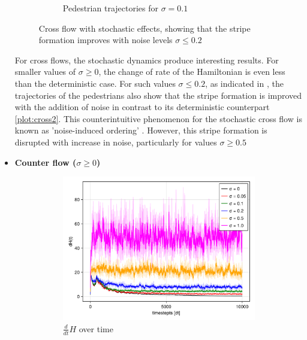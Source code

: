 \begin{itemize}
\begin{figure}[H]
\begin{subfigure}{.49\textwidth}
            \caption{Pedestrian trajectories for $\sigma = 0.1$}
            \label{plot:stoc_cross_traj}
        \end{subfigure}
        \caption{Cross flow with stochastic effects, showing that the stripe formation improves with noise levels $\sigma \leq 0.2$}
        \label{plot:stoc_cross}
    \end{figure}
    For cross flows, the stochastic dynamics produce interesting results. For smaller values of $\sigma\geq 0$, the change of rate of the Hamiltonian is even less than the deterministic case. For such values $\sigma \leq 0.2$, as indicated in \cite{khelfa2021initiating}, the trajectories of the pedestrians also show that the stripe formation is improved with the addition of noise in contrast to its deterministic counterpart \autoref{plot:cross2}. This counterintuitive phenomenon for the stochastic cross flow is known as 'noise-induced ordering' \cite{d2021canard}. However, this stripe formation is disrupted with increase in noise, particularly for values $\sigma \geq 0.5$
    \item \textbf{Counter flow ($\sigma \geq 0$)}
    \begin{figure}[H]
        \centering
        \begin{subfigure}{.49\textwidth}
            \centering
            \includegraphics[width=\linewidth]{figures/dH_stochasic_counter.png}
            \caption{$\frac{d}{dt}H$ over time}
            \label{plot:stoc_counter_dh}
        \end{subfigure}
        \begin{subfigure}{.49\textwidth}
            \centering

\end{subfigure}
\end{figure}
\end{itemize}
